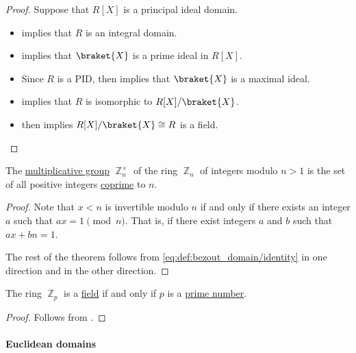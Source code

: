 \begin{proof}
  \NecessitySubProof* Suppose that \( R[X] \) is a principal ideal domain.
  \begin{itemize}
    \item {} implies that \( R \) is an integral domain.
    \item {} implies that \( \braket{ X } \) is a prime ideal in \( R[X] \).
    \item Since \( R \) is a PID,  then implies that \( \braket{ X } \) is a maximal ideal.
    \item {} implies that \( R \) is isomorphic to \( R[X] / \braket{ X } \).
    \item {} then implies \( R[X] / \braket{ X } \cong R \) is a field.
  \end{itemize}
\end{proof}

\begin{proposition}\label{thm:multiplicative_group_of_integers_modulo}
  The \hyperref[def:semiring]{multiplicative group} \( \BbbZ_n^\times \) of the ring \hyperref[def:ring_of_integers_modulo]{\( \BbbZ_n \)} of integers modulo \( n > 1 \) is the set of all positive integers \hyperref[def:coprime_elements]{coprime} to \( n \).
\end{proposition}
\begin{proof}
  Note that \( x < n \) is invertible modulo \( n \) if and only if there exists an integer \( a \) such that \( ax = 1 \pmod n \). That is, if there exist integers \( a \) and \( b \) such that \( ax + bn = 1 \).

  The rest of the theorem follows from \eqref{eq:def:bezout_domain/identity} in one direction and  in the other direction.
\end{proof}

\begin{corollary}\label{thm:zp_is_field}
  The ring \( \BbbZ_p \) is a \hyperref[def:field]{field} if and only if \( p \) is a \hyperref[def:prime_number]{prime number}.
\end{corollary}
\begin{proof}
  Follows from .
\end{proof}

\paragraph{Euclidean domains}


